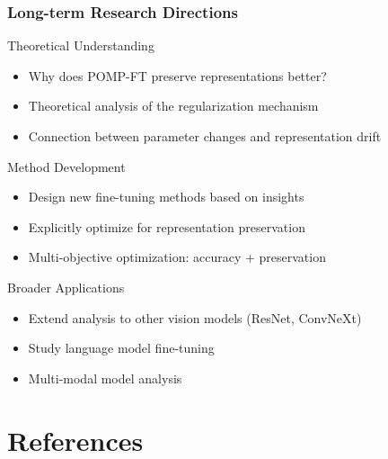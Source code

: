 \documentclass[aspectratio=1610, fontsize=8pt]{beamer}
\begin{document}
\begin{frame}
    \frametitle{Long-term Research Directions}
    \begin{block}{Theoretical Understanding}
        \begin{itemize}
            \item Why does POMP-FT preserve representations better?
            \item Theoretical analysis of the regularization mechanism
            \item Connection between parameter changes and representation drift
        \end{itemize}
    \end{block}
    
    \begin{block}{Method Development}
        \begin{itemize}
            \item Design new fine-tuning methods based on insights
            \item Explicitly optimize for representation preservation
            \item Multi-objective optimization: accuracy + preservation
        \end{itemize}
    \end{block}
    
    \begin{block}{Broader Applications}
        \begin{itemize}
            \item Extend analysis to other vision models (ResNet, ConvNeXt)
            \item Study language model fine-tuning
            \item Multi-modal model analysis
        \end{itemize}
    \end{block}
\end{frame}

\section{References}
\end{document}
